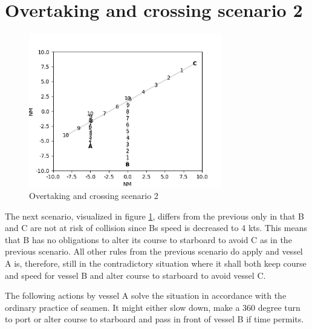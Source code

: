 \section{Overtaking and crossing scenario 2}%


\begin{figure}[H]
    \centering
    \includegraphics[width=0.75\textwidth,height=0.75\textheight,keepaspectratio]{../src/img/overtaking_crossing_3.png}
    \caption[Overtaking and crossing scenario 2]{Overtaking and crossing scenario 2 \cite{ecolreg_overtaking-and-crossing-3}}
    \label{fig:overtaking-and-crossing-3}
\end{figure}
The next scenario, visualized in figure \ref{fig:overtaking-and-crossing-3}, differs from the previous only in that B and C are not at risk of collision since Bs speed is decreased to 4 kts. This means that B has no obligations to alter its course to starboard to avoid C as in the previous scenario. All other rules from the previous scenario do apply and vessel A is, therefore, still in the contradictory situation where it shall both keep course and speed for vessel B and alter course to starboard to avoid vessel C.

The following actions by vessel A solve the situation in accordance with the ordinary practice of seamen. It might either slow down, make a 360 degree turn to port or alter course to starboard and pass in front of vessel B if time permits.




